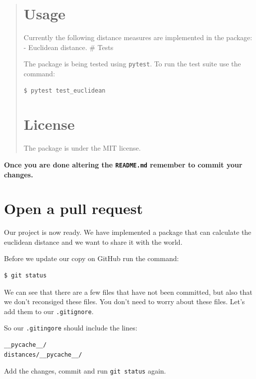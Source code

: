 \documentclass[11pt]{article}
\begin{document}
\begin{quote}
\hypertarget{usage}{%
\section{Usage}\label{usage}}

Currently the following distance measures are implemented in the
package: - Euclidean distance. \# Tests

The package is being tested using \texttt{pytest}. To run the test suite
use the command:

\begin{verbatim}
$ pytest test_euclidean
\end{verbatim}

\hypertarget{license}{%
\section{License}\label{license}}

The package is under the MIT license.
\end{quote}

\textbf{Once you are done altering the \texttt{README.md} remember to
commit your changes.}

    \hypertarget{open-a-pull-request}{%
\section{Open a pull request}\label{open-a-pull-request}}

    Our project is now ready. We have implemented a package that can
calculate the euclidean distance and we want to share it with the world.

Before we update our copy on GitHub run the command:

\begin{verbatim}
$ git status
\end{verbatim}

We can see that there are a few files that have not been committed, but
also that we don't reconsiged these files. You don't need to worry about
these files. Let's add them to our \texttt{.gitignore}.

So our \texttt{.gitingore} should include the lines:

\begin{verbatim}
__pycache__/
distances/__pycache__/
\end{verbatim}

Add the changes, commit and run \texttt{git\ status} again.
\end{document}
